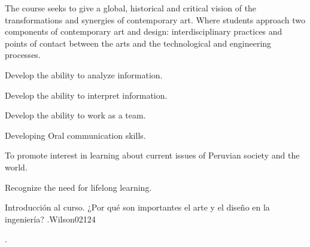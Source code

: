 \begin{syllabus}


\begin{justification}
The course seeks to give a global, historical and critical vision of the transformations and synergies of contemporary art. Where students approach two components of contemporary art and design: interdisciplinary practices and points of contact between the arts and the technological and engineering processes.
\end{justification}

\begin{goals}
    \item Develop the ability to analyze information.
    \item Develop the ability to interpret information.
    \item Develop the ability to work as a team.
    \item Developing Oral communication skills.
    \item To promote interest in learning about current issues of Peruvian society and the world.
    \item Recognize the need for lifelong learning.
    
\item 
\end{goals}

\begin{outcomes}
    \item {}
    \item {}
\end{outcomes}

\begin{competences}
    \item {}
\end{competences}

\begin{unit}{Introducción al curso. ¿Por qué son importantes el arte y el diseño en la ingeniería? .}{}{Wilson02}{12}{4}
   \begin{topics}
      \item . 
   \end{topics}
   \begin{learningoutcomes}
      \item 
   \end{learningoutcomes}
\end{unit}


\end{syllabus}
